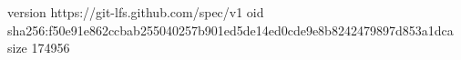 version https://git-lfs.github.com/spec/v1
oid sha256:f50e91e862ccbab255040257b901ed5de14ed0cde9e8b8242479897d853a1dca
size 174956
